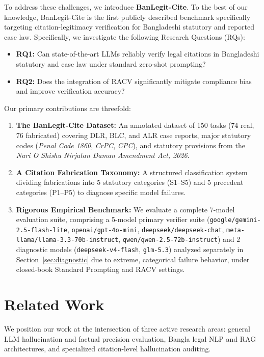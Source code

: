 \documentclass[conference]{IEEEtran}
\begin{document}
To address these challenges, we introduce \textbf{BanLegit-Cite}. To the best of our knowledge, BanLegit-Cite is the first publicly described benchmark specifically targeting citation-legitimacy verification for Bangladeshi statutory and reported case law. Specifically, we investigate the following Research Questions (RQs):
\begin{itemize}
\item \textbf{RQ1:} Can state-of-the-art LLMs reliably verify legal citations in Bangladeshi statutory and case law under standard zero-shot prompting?
\item \textbf{RQ2:} Does the integration of RACV significantly mitigate compliance bias and improve verification accuracy?
\end{itemize}

Our primary contributions are threefold:
\begin{enumerate}
\item \textbf{The BanLegit-Cite Dataset:} An annotated dataset of 150 tasks (74 real, 76 fabricated) covering DLR, BLC, and ALR case reports, major statutory codes (\textit{Penal Code 1860}, \textit{CrPC}, \textit{CPC}), and statutory provisions from the \textit{Nari O Shishu Nirjatan Daman Amendment Act, 2026}.
\item \textbf{A Citation Fabrication Taxonomy:} A structured classification system dividing fabrications into 5 statutory categories (S1--S5) and 5 precedent categories (P1--P5) to diagnose specific model failures.
\item \textbf{Rigorous Empirical Benchmark:} We evaluate a complete 7-model evaluation suite, comprising a 5-model primary verifier suite (\texttt{google/gemini-2.5-flash-lite}, \texttt{openai/gpt-4o-mini}, \texttt{deepseek/deepseek-chat}, \texttt{meta-llama/llama-3.3-70b-instruct}, \texttt{qwen/qwen-2.5-72b-instruct}) and 2 diagnostic models (\texttt{deepseek-v4-flash}, \texttt{glm-5.3}) analyzed separately in Section~\ref{sec:diagnostic} due to extreme, categorical failure behavior, under closed-book Standard Prompting and RACV settings.
\end{enumerate}

\section{Related Work}
We position our work at the intersection of three active research areas: general LLM hallucination and factual precision evaluation, Bangla legal NLP and RAG architectures, and specialized citation-level hallucination auditing.
\end{document}
